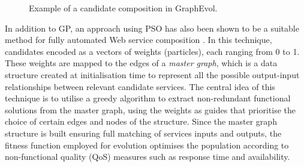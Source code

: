 \documentclass{article}
\begin{document}
\begin{figure}
\centerline{
}
\caption{Example of a candidate composition in GraphEvol.}
\label{fig:graphExample}
\end{figure}

In addition to GP, an approach using PSO has also been shown to be a suitable method for fully automated Web service composition \cite{silva2014graph}. In this technique, candidates encoded as a vectors of weights (particles), each ranging from 0 to 1. These weights are mapped to the edges of a \textit{master graph}, which is a data structure created at 
initialisation time to represent all the possible output-input relationships between relevant candidate services. The central idea of this technique is to utilise a greedy algorithm
to extract non-redundant functional solutions from the master graph, using the weights as guides that prioritise the choice of certain edges and nodes of the structure.
Since
the master graph structure is built ensuring full matching of services inputs and outputs, the fitness function employed for evolution optimises the population according to non-functional quality (QoS) measures such as response time and availability.
\end{document}
